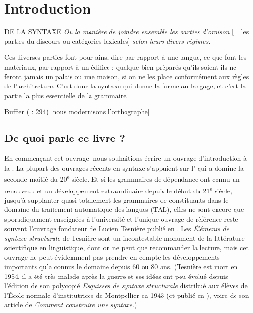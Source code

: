 \chapter{Introduction}

\epigraph{DE LA SYNTAXE \textit{Ou la manière de joindre ensemble les parties d’oraison} [= les parties du discours ou catégories lexicales] \textit{selon leurs divers régimes.}

Ces diverses parties font pour ainsi dire par rapport à une langue, ce que font les matériaux, par rapport à un édifice : quelque bien préparés qu’ils soient ils ne feront jamais un palais ou une maison, si on ne les place conformément aux règles de l’architecture. C’est donc la syntaxe qui donne la forme au langage, et c’est la partie la plus essentielle de la grammaire.}{Buffier (\citeyear{buffier1709grammaire} : 294) [nous modernisons l’orthographe]}

\section{De quoi parle ce livre ?}\label{sec:0.0.0}

En commençant cet ouvrage, nous souhaitions écrire un ouvrage d’introduction à la . La plupart des ouvrages récents en syntaxe s’appuient sur l’ qui a dominé la seconde moitié du 20\textsuperscript{e} siècle. Et si les grammaires de dépendance ont connu un renouveau et un développement extraordinaire depuis le début du 21\textsuperscript{e} siècle, jusqu’à supplanter quasi totalement les grammaires de constituants dans le domaine du traitement automatique des langues (TAL), elles ne sont encore que sporadiquement enseignées à l’université et l’unique ouvrage de référence reste souvent l’ouvrage fondateur de Lucien Tesnière publié en \citeyear{tesniere1959elements}. Les \textit{Éléments} \textit{de syntaxe structurale} de Tesnière sont un incontestable monument de la littérature scientifique en linguistique, dont on ne peut que recommander la lecture, mais cet ouvrage ne peut évidemment pas prendre en compte les développements importants qu’a connus le domaine depuis 60 ou 80 ans. (Tesnière est mort en 1954, il a été très malade après la guerre et ses idées ont peu évolué depuis l’édition de son polycopié \textit{Esquisses de syntaxe structurale} distribué aux élèves de l’École normale d’institutrices de Montpellier en 1943 (et publié en \citeyear{tesniere1953esquisse}), voire de son article de \citeyear{tesniere1934comment} \textit{Comment construire une syntaxe}.)

